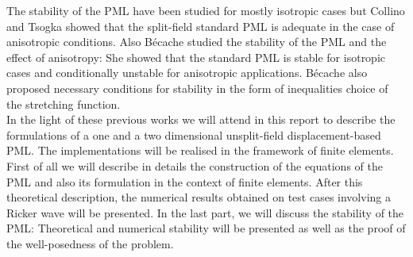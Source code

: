 The stability of the PML have been studied for mostly isotropic cases but Collino and Tsogka \cite{Collino} showed that the split-field standard PML is adequate in the case of anisotropic conditions. Also Bécache \cite{Becache} studied the stability of the PML and the effect of anisotropy: She showed that the standard PML is stable for isotropic cases and conditionally unstable for anisotropic applications. Bécache also proposed necessary conditions for stability in the form of inequalities choice of the stretching function.\\
In the light of these previous works we will attend in this report to describe the formulations of a one and a two dimensional unsplit-field displacement-based PML. The implementations will be realised in the framework of finite elements. First of all we will describe in details the construction of the equations of the PML and also its formulation in the context of finite elements. After this theoretical description, the numerical results obtained on test cases involving a Ricker wave will be presented. In the last part, we will discuss the stability of the PML: Theoretical and numerical stability will be presented as well as the proof of the well-posedness of the problem.   















